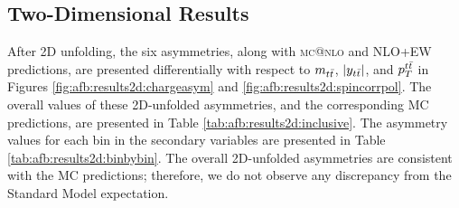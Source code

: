 \subsection{Two-Dimensional Results}
\label{ssec:afb:results2d}

After 2D unfolding, the six asymmetries, along with \textsc{mc@nlo}
and NLO+EW predictions, are presented differentially
with respect to $m_{t\bar{t}}$, $|y_{t\bar{t}}|$, and $p_T^{t\bar{t}}$ in
Figures \ref{fig:afb:results2d:chargeasym} and
\ref{fig:afb:results2d:spincorrpol}. The overall values of these
2D-unfolded asymmetries, and the corresponding MC predictions, are presented in
Table \ref{tab:afb:results2d:inclusive}. The asymmetry values for each
bin in the secondary variables are presented in Table
\ref{tab:afb:results2d:binbybin}. The overall 2D-unfolded asymmetries
are consistent with the MC predictions; therefore, we do not observe
any discrepancy from the Standard Model expectation.

